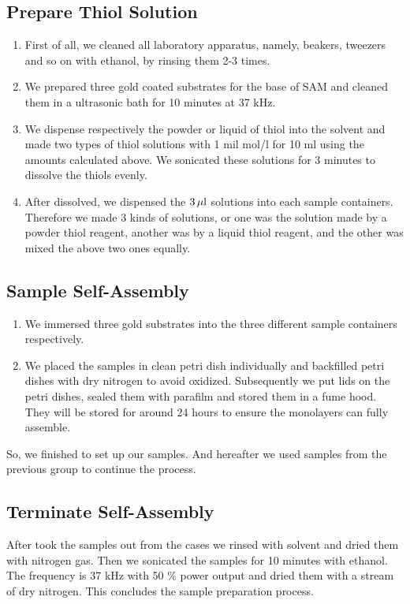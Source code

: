 \subsection{Prepare Thiol Solution}
\begin{enumerate}
 \item First of all, we cleaned all laboratory apparatus, namely, beakers, tweezers and so on with ethanol, by rinsing them 2-3 times.
 \item We prepared three gold coated substrates for the base of SAM and cleaned them in a ultrasonic bath for 10 minutes at 37 kHz.
 \item We dispense respectively the powder or liquid of thiol into the solvent and made two types of thiol solutions with 1 mil mol/l for 10 ml using the amounts calculated above. We sonicated these solutions for 3 minutes to dissolve the thiols evenly.
 \item After dissolved, we dispensed the $3 \, \mu \rm l$ solutions into each sample containers. Therefore we made 3 kinds of solutions, or one was the solution made by a powder thiol reagent, another was by a liquid thiol reagent, and the other was mixed the above two ones equally. 
\end{enumerate}
\subsection{Sample Self-Assembly}
\begin{enumerate}
 \item We immersed three gold substrates into the three different sample containers respectively.  
 \item We placed the samples in clean petri dish individually and backfilled petri dishes with dry nitrogen to avoid oxidized. Subsequently we put lids on the petri dishes, sealed them with parafilm and stored them in a fume hood. They will be stored for around 24 hours to ensure the monolayers can fully assemble.
\end{enumerate}
So, we finished to set up our samples. And hereafter we used samples from the previous group to continue the process.


\subsection{Terminate Self-Assembly}
After took the samples out from the cases we rinsed with solvent and dried them with nitrogen gas. Then we sonicated the samples for 10 minutes with ethanol. The frequency is 37 kHz with 50 \% power output and dried them with a stream of dry nitrogen. This concludes the sample preparation process.
